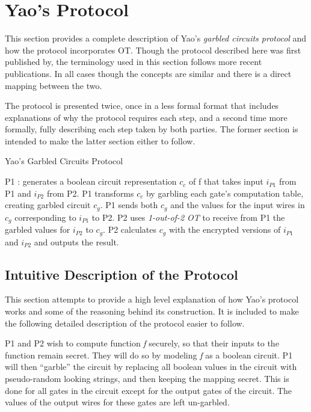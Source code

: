 \section{Yao's Protocol}
\label{sec:protocol}

This section provides a complete description of Yao's \emph{garbled circuits protocol} and how the protocol incorporates \ac{OT}.  Though the protocol described here was first published by\cite{goldreich1987play}, the terminology used in this section follows more recent publications\cite{hazay2010efficient}. In all cases though the concepts are similar and there is a direct mapping between the two.

The protocol is presented twice, once in a less formal format that includes explanations of why the protocol requires each step, and a second time more formally, fully describing each step taken by both parties. The former section is intended to make the latter section either to follow.

\begin{algorithm}[H]
    \caption{Yao's Garbled Circuits Protocol}
    \label{alg:yao}
    \begin{algorithmic}[1]
        \STATE \ac{P1} : generates a boolean circuit representation $c_c$ of \ac{f} that takes input $i_{P1}$ from \ac{P1} and $i_{P2}$ from \ac{P2}.
        \STATE \ac{P1} transforms $c_c$ by garbling each gate's computation table, creating garbled circuit $c_g$.
        \STATE \ac{P1} sends both $c_g$ and the values for the input wires in $c_g$ corresponding to $i_{P1}$ to \ac{P2}.
        \STATE \ac{P2} uses \emph{1-out-of-2 \ac{OT}} to receive from \ac{P1} the garbled values for $i_{P2}$ to $c_g$.
        \STATE \ac{P2} calculates $c_g$ with the encrypted versions of $i_{P1}$ and $i_{P2}$ and outputs the result.
    \end{algorithmic}
\end{algorithm}

\subsection{Intuitive Description of the Protocol}

This section attempts to provide a high level explanation of how Yao's protocol works and some of the reasoning behind its construction. It is included to make the following detailed description of the protocol easier to follow.

\ac{P1} and \ac{P2} wish to compute function \emph{f} securely, so that their inputs to the function remain secret. They will do so by modeling \emph{f} as a boolean circuit. \ac{P1} will then ``garble'' the circuit by replacing all boolean values in the circuit with pseudo-random looking strings, and then keeping the mapping secret. This is done for all gates in the circuit except for the output gates of the circuit.  The values of the output wires for these gates are left un-garbled.

